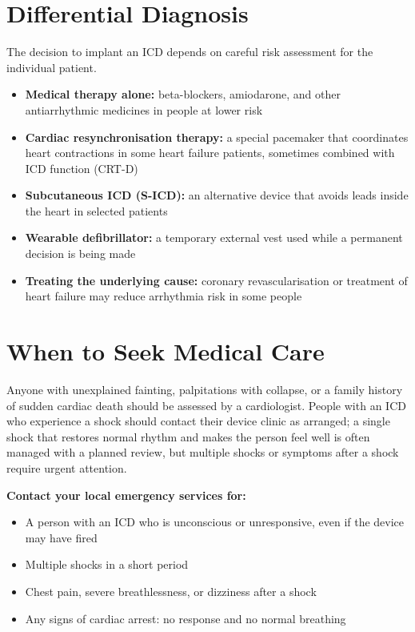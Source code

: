 \section*{Differential Diagnosis}
The decision to implant an ICD depends on careful risk assessment for the individual patient.
\begin{itemize}
    \item \textbf{Medical therapy alone:} beta-blockers, amiodarone, and other antiarrhythmic medicines in people at lower risk
    \item \textbf{Cardiac resynchronisation therapy:} a special pacemaker that coordinates heart contractions in some heart failure patients, sometimes combined with ICD function (CRT-D)
    \item \textbf{Subcutaneous ICD (S-ICD):} an alternative device that avoids leads inside the heart in selected patients
    \item \textbf{Wearable defibrillator:} a temporary external vest used while a permanent decision is being made
    \item \textbf{Treating the underlying cause:} coronary revascularisation or treatment of heart failure may reduce arrhythmia risk in some people
\end{itemize}

\section*{When to Seek Medical Care}
Anyone with unexplained fainting, palpitations with collapse, or a family history of sudden cardiac death should be assessed by a cardiologist. People with an ICD who experience a shock should contact their device clinic as arranged; a single shock that restores normal rhythm and makes the person feel well is often managed with a planned review, but multiple shocks or symptoms after a shock require urgent attention.

\textbf{Contact your local emergency services for:}
\begin{itemize}
    \item A person with an ICD who is unconscious or unresponsive, even if the device may have fired
    \item Multiple shocks in a short period
    \item Chest pain, severe breathlessness, or dizziness after a shock
    \item Any signs of cardiac arrest: no response and no normal breathing
\end{itemize}

